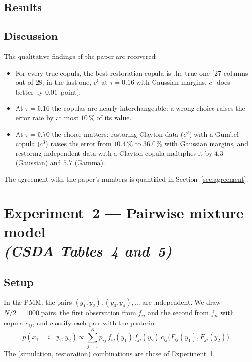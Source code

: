 \documentclass[11pt,a4paper]{article}
\begin{document}
\subsection{Results}






\subsection{Discussion}

The qualitative findings of the paper are recovered:
\begin{itemize}
  \item For every true copula, the best restoration copula is the true one
        (27 columns out of 28; in the last one, $c^4$ at $\tau=0.16$ with
        Gaussian margins, $c^1$ does better by $0.01$~point).
  \item At $\tau=0.16$ the copulas are nearly interchangeable: a wrong
        choice raises the error rate by at most $10\,\%$ of its value.
  \item At $\tau=0.70$ the choice matters: restoring Clayton data ($c^6$)
        with a Gumbel copula ($c^3$) raises the error from $10.4\,\%$ to
        $36.0\,\%$ with Gaussian margins, and restoring independent data
        with a Clayton copula multiplies it by $4.3$ (Gaussian) and $5.7$
        (Gamma).
\end{itemize}
The agreement with the paper's numbers is quantified in
Section~\ref{sec:agreement}.

\section{Experiment~2 --- Pairwise mixture model\\
        \emph{(CSDA Tables~4 and~5)}}\label{sec:exp2}

\subsection{Setup}

In the PMM, the pairs $(y_1,y_2),(y_3,y_4),\dots$ are independent. We draw
$N/2=1000$ pairs, the first observation from $f_{ij}$ and the second from
$f_{ji}$ with copula $c_{ij}$, and classify each pair with the posterior
\begin{equation}
   p(x_{1}=i \mid y_{1},y_{2}) \propto
     \sum_{j=1}^{K} p_{ij}\,f_{ij}(y_1)\,f_{ji}(y_2)\,
     c_{ij}\bigl(F_{ij}(y_1),F_{ji}(y_2)\bigr).
\end{equation}
The (simulation, restoration) combinations are those of
Experiment~1.
\end{document}
